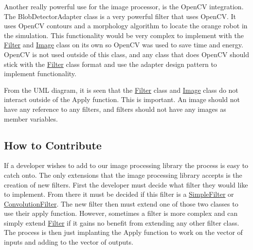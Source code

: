 Another really powerful use for the image processor, is the Open\+CV integration. The Blob\+Detector\+Adapter class is a very powerful filter that uses Open\+CV. It uses Open\+CV contours and a morphology algorithm to locate the orange robot in the simulation. This functionality would be very complex to implement with the \hyperlink{classFilter}{Filter} and \hyperlink{classImage}{Image} class on its own so Open\+CV was used to save time and energy. Open\+CV is not used outside of this class, and any class that does Open\+CV should stick with the \hyperlink{classFilter}{Filter} class format and use the adapter design pattern to implement functionality.

From the U\+ML diagram, it is seen that the \hyperlink{classFilter}{Filter} class and \hyperlink{classImage}{Image} class do not interact outside of the Apply function. This is important. An image should not have any reference to any filters, and filters should not have any images as member variables.\hypertarget{image_processing_description_image_processing_contribute}{}\subsection{How to Contribute}\label{image_processing_description_image_processing_contribute}
If a developer wishes to add to our image processing library the process is easy to catch onto. The only extensions that the image processing library accepts is the creation of new filters. First the developer must decide what filter they would like to implement. From there it must be decided if this filter is a \hyperlink{classSimpleFilter}{Simple\+Filter} or \hyperlink{classConvolutionFilter}{Convolution\+Filter}. The new filter then must extend one of those two classes to use their apply function. However, sometimes a filter is more complex and can simply extend \hyperlink{classFilter}{Filter} if it gains no benefit from extending any other filter class. The process is then just implanting the Apply function to work on the vector of inputs and adding to the vector of outputs. 